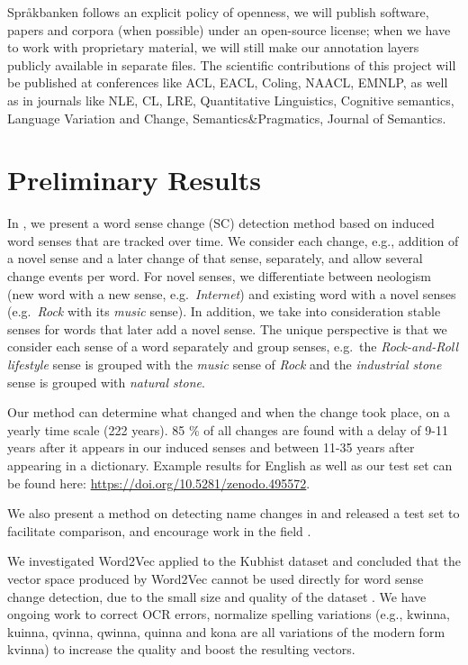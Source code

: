 \documentclass[12pt,twoside,a4paper]{article}
\newcommand\eg{{e.g.\ }}
\begin{document}
		Språkbanken follows an explicit policy of openness, we will publish software, papers and corpora (when possible) under an open-source license; when we have to work with proprietary material, we will still make our annotation layers publicly available in separate files.   The scientific contributions of this project will be published at conferences like ACL, EACL, Coling, NAACL, EMNLP, as well as in journals like NLE, CL, LRE, Quantitative Linguistics, Cognitive semantics, Language Variation and Change, Semantics\&Pragmatics, Journal of Semantics. 

	
	\section{Preliminary Results}
	In \citep{Tahmasebi-RANLP2017,tahmasebi2013models}, we present a word sense change (SC) detection method based on induced word senses that are tracked over time. We consider each change, e.g., addition of a novel sense and a later change of that sense, separately, and allow several change events per word. For novel senses, we differentiate between neologism (new word with a new sense, \eg \textit{Internet}) and existing word with a novel senses (\eg \textit{Rock} with its \textit{music} sense). In addition, we take into consideration stable senses for words that later add a novel sense. 
	The unique perspective is that we consider each sense of a word separately and group senses, \eg the \textit{Rock-and-Roll lifestyle} sense is grouped with the \textit{music} sense of \textit{Rock} and the \textit{industrial stone} sense is grouped with \textit{natural stone}. 
	
Our method can determine what changed and when the change took place, on a yearly time scale (222 years). 85 \% of all changes are found with a delay of 9-11 years after it appears in our induced senses and between 11-35 years after appearing in a dictionary. Example results for English as well as our test set  can be found here: \url{ https://doi.org/10.5281/zenodo.495572}.	 

	 
	 We also present a method on detecting name changes in \cite{ourColingPaper} and released a test set to facilitate comparison, and encourage work in the field \citep{OURDATASET}.
	 
	 We investigated Word2Vec applied to the Kubhist dataset and concluded that the vector space produced by Word2Vec cannot be used directly for word sense change detection, due to the small size and quality of the dataset \citep{Tahmasebi-DHN2018}. We have ongoing work to correct OCR errors, normalize spelling variations (e.g., kwinna, kuinna, qvinna, qwinna, quinna and kona are all variations of the modern form kvinna) to increase the quality and boost the resulting vectors. 
\end{document}
